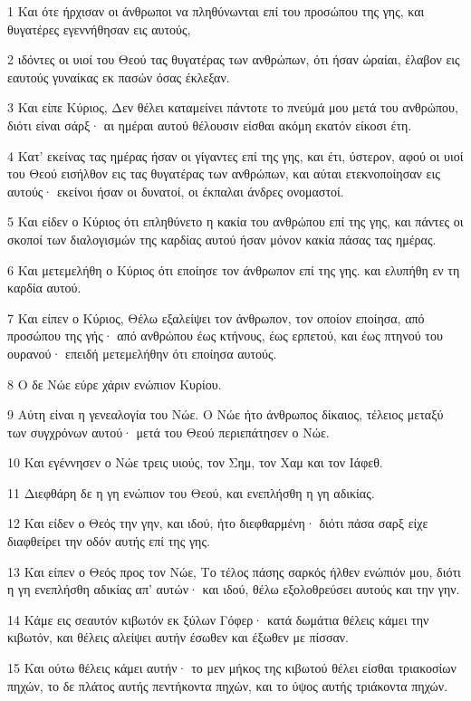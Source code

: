 \par 1 Και ότε ήρχισαν οι άνθρωποι να πληθύνωνται επί του προσώπου της γης, και θυγατέρες εγεννήθησαν εις αυτούς,
\par 2 ιδόντες οι υιοί του Θεού τας θυγατέρας των ανθρώπων, ότι ήσαν ώραίαι, έλαβον εις εαυτούς γυναίκας εκ πασών όσας έκλεξαν.
\par 3 Και είπε Κύριος, Δεν θέλει καταμείνει πάντοτε το πνεύμά μου μετά του ανθρώπου, διότι είναι σάρξ· αι ημέραι αυτού θέλουσιν είσθαι ακόμη εκατόν είκοσι έτη.
\par 4 Κατ' εκείνας τας ημέρας ήσαν οι γίγαντες επί της γης, και έτι, ύστερον, αφού οι υιοί του Θεού εισήλθον εις τας θυγατέρας των ανθρώπων, και αύται ετεκνοποίησαν εις αυτούς· εκείνοι ήσαν οι δυνατοί, οι έκπαλαι άνδρες ονομαστοί.
\par 5 Και είδεν ο Κύριος ότι επληθύνετο η κακία του ανθρώπου επί της γης, και πάντες οι σκοποί των διαλογισμών της καρδίας αυτού ήσαν μόνον κακία πάσας τας ημέρας.
\par 6 Και μετεμελήθη ο Κύριος ότι εποίησε τον άνθρωπον επί της γης. και ελυπήθη εν τη καρδία αυτού.
\par 7 Και είπεν ο Κύριος, Θέλω εξαλείψει τον άνθρωπον, τον οποίον εποίησα, από προσώπου της γής· από ανθρώπου έως κτήνους, έως ερπετού, και έως πτηνού του ουρανού· επειδή μετεμελήθην ότι εποίησα αυτούς.
\par 8 Ο δε Νώε εύρε χάριν ενώπιον Κυρίου.
\par 9 Αύτη είναι η γενεαλογία του Νώε. Ο Νώε ήτο άνθρωπος δίκαιος, τέλειος μεταξύ των συγχρόνων αυτού· μετά του Θεού περιεπάτησεν ο Νώε.
\par 10 Και εγέννησεν ο Νώε τρεις υιούς, τον Σημ, τον Χαμ και τον Ιάφεθ.
\par 11 Διεφθάρη δε η γη ενώπιον του Θεού, και ενεπλήσθη η γη αδικίας.
\par 12 Και είδεν ο Θεός την γην, και ιδού, ήτο διεφθαρμένη· διότι πάσα σαρξ είχε διαφθείρει την οδόν αυτής επί της γης.
\par 13 Και είπεν ο Θεός προς τον Νώε, Το τέλος πάσης σαρκός ήλθεν ενώπιόν μου, διότι η γη ενεπλήσθη αδικίας απ' αυτών· και ιδού, θέλω εξολοθρεύσει αυτούς και την γην.
\par 14 Κάμε εις σεαυτόν κιβωτόν εκ ξύλων Γόφερ· κατά δωμάτια θέλεις κάμει την κιβωτόν, και θέλεις αλείψει αυτήν έσωθεν και έξωθεν με πίσσαν.
\par 15 Και ούτω θέλεις κάμει αυτήν· το μεν μήκος της κιβωτού θέλει είσθαι τριακοσίων πηχών, το δε πλάτος αυτής πεντήκοντα πηχών, και το ύψος αυτής τριάκοντα πηχών.
